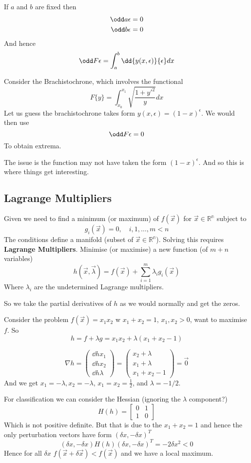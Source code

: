 \documentclass{E:/Documents/Latex/myassignment}
\begin{document}
If $a$ and $b$ are fixed then
\begin{align*}
	\odd a \epsilon = 0\\
	\odd b \epsilon = 0
\end{align*}
And hence
\[	\odd F\epsilon = \int_{a}^{b} \dd{y(x,\epsilon)}{\epsilon} dx\]


Consider the Brachistochrone, which involves the functional
\[F\{y\} = \int_{x_0}^{x_1} \sqrt{\frac{1 + y'^2}{y}} dx\]
Let us guess the brachistochrone takes form $y(x,\epsilon) = (1-x)^\epsilon$. We would then use 
\[\odd F \epsilon =0\]
To obtain extrema.


The issue is the function may not have taken the form $(1-x)^\epsilon$. And so this is where things get interesting.

\subsection{Lagrange Multipliers}
Given we need to find a minimum (or maximum) of $f(\vec x)$ for $\vec x \in \mathbb{R^n}$ subject to 
\[g_i(\vec x) = 0, \quad i,1,\hdots,m < n\]
The conditions define a manifold (subset of $\vec x \in \mathbb{R^{n}}$). Solving this requires \textbf{Lagrange Multipliers}. Minimise (or maximise) a new function (of $m+n$ variables)
\[h(\vec x,\vec \lambda) = f(\vec x) + \sum_{i=1}^m \lambda_i g_i(\vec x)\]
Where $\lambda_i$ are the undetermined Lagrange multipliers.

So we take the partial derivatives of $h$ as we would normally and get the zeros.


Consider the problem $f(\vec x) = x_1x_2$ w $x_1+x_2 = 1$, $x_1,x_2 > 0$, want to maximise $f$. So
\[h = f + \lambda g = x_1x_2 + \lambda(x_1+x_2-1)\]

\[\nabla h = \begin{pmatrix}
	\dd h{x_1} \\ \dd h{x_2}\\\dd h{\lambda}
\end{pmatrix} =  \begin{pmatrix}
	x_2 + \lambda \\
	x_1 + \lambda  \\
	x_1+x_2-1
\end{pmatrix} = \vec 0\]
And we get $x_1 = -\lambda, x_2 = -\lambda$, $x_1 = x_2 = \frac12$, and $\lambda = -1/2$.

For classification we can consider the Hessian (ignoring the $\lambda$ component?)
\[H(h) = \begin{bmatrix}
	0&1\\1&0
\end{bmatrix}\]
Which is not positive definite. But that is due to the $x_1+x_2 = 1$ and hence the only perturbation vectors have form $(\delta x, -\delta x)^T$
\[(\delta x, -\delta x) H(h) (\delta x, -\delta x)^T = -2 \delta x^2 < 0\]
Hence for all $\delta x$ $f(\vec x + \delta \vec x ) < f(\vec x)$ and we have a local maximum.
\end{document}
